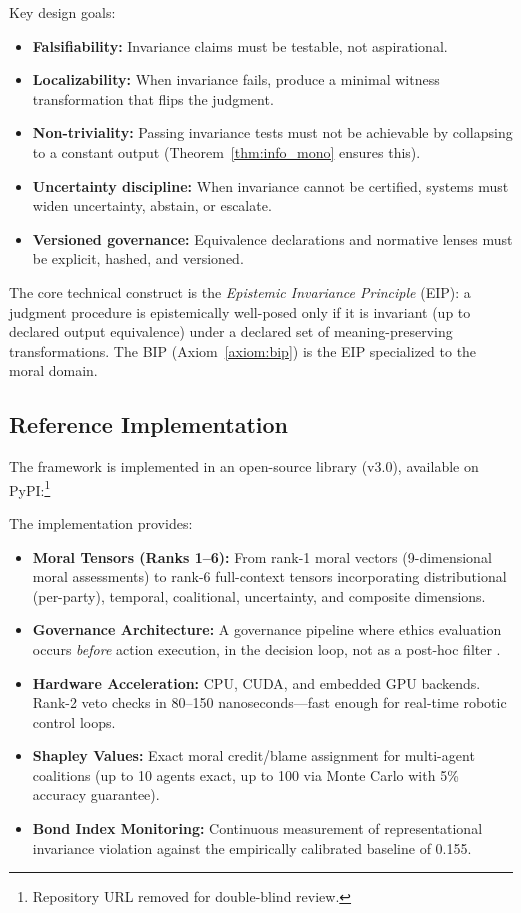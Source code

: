 \documentclass[12pt]{article}
\theoremstyle{definition}
\theoremstyle{remark}
\begin{document}
Key design goals:
\begin{itemize}
    \item \textbf{Falsifiability:} Invariance claims must be testable, not aspirational.
    \item \textbf{Localizability:} When invariance fails, produce a minimal witness transformation that flips the judgment.
    \item \textbf{Non-triviality:} Passing invariance tests must not be achievable by collapsing to a constant output (Theorem~\ref{thm:info_mono} ensures this).
    \item \textbf{Uncertainty discipline:} When invariance cannot be certified, systems must widen uncertainty, abstain, or escalate.
    \item \textbf{Versioned governance:} Equivalence declarations and normative lenses must be explicit, hashed, and versioned.
\end{itemize}

The core technical construct is the \emph{Epistemic Invariance Principle} (EIP): a judgment procedure is epistemically well-posed only if it is invariant (up to declared output equivalence) under a declared set of meaning-preserving transformations. The BIP (Axiom~\ref{axiom:bip}) is the EIP specialized to the moral domain.

\subsection{Reference Implementation}

The framework is implemented in an open-source library (v3.0), available on PyPI:\footnote{Repository URL removed for double-blind review.}

The implementation provides:

\begin{itemize}
    \item \textbf{Moral Tensors (Ranks 1--6):} From rank-1 moral vectors (9-dimensional moral assessments) to rank-6 full-context tensors incorporating distributional (per-party), temporal, coalitional, uncertainty, and composite dimensions.
    \item \textbf{Governance Architecture:} A governance pipeline where ethics evaluation occurs \emph{before} action execution, in the decision loop, not as a post-hoc filter \citep{anon2026b}.
    \item \textbf{Hardware Acceleration:} CPU, CUDA, and embedded GPU backends. Rank-2 veto checks in 80--150 nanoseconds---fast enough for real-time robotic control loops.
    \item \textbf{Shapley Values:} Exact moral credit/blame assignment for multi-agent coalitions (up to 10 agents exact, up to 100 via Monte Carlo with 5\% accuracy guarantee).
    \item \textbf{Bond Index Monitoring:} Continuous measurement of representational invariance violation against the empirically calibrated baseline of 0.155.
\end{itemize}
\end{document}
